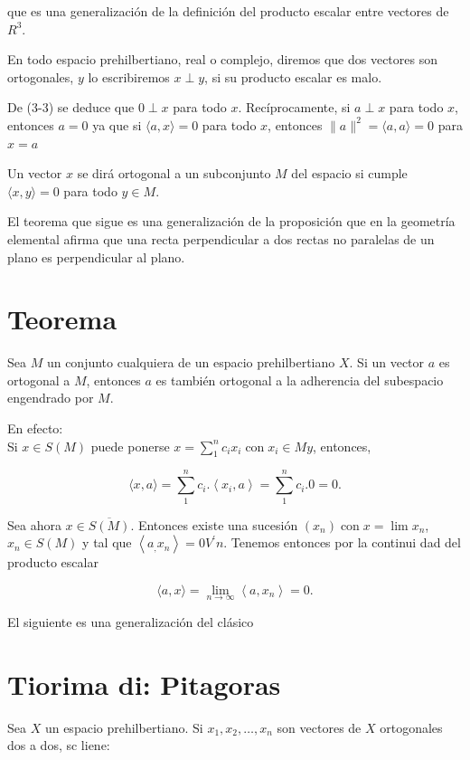 \documentclass[10pt]{article}
\theoremstyle{plain}
\theoremstyle{definition}
\theoremstyle{remark}
\begin{document}
que es una generalización de la definición del producto escalar entre vectores de $R^{3}$.


En todo espacio prehilbertiano, real o complejo, diremos que dos vectores son ortogonales, $y$ lo escribiremos $x \perp y$, si su producto escalar es malo.

De (3-3) se deduce que $0 \perp x$ para todo $x$. Recíprocamente, si $a \perp x$ para todo $x$, entonces $a=0$ ya que si $\langle a, x\rangle=0$ para todo $x$, entonces $\|a\|^{2}=\langle a, a\rangle=0$ para $x=a$

Un vector $x$ se dirá ortogonal a un subconjunto $M$ del espacio si cumple $\langle x, y\rangle=0$ para todo $y \in M$.

El teorema que sigue es una generalización de la proposición que en la geometría elemental afirma que una recta perpendicular a dos rectas no paralelas de un plano es perpendicular al plano.

\section*{Teorema}
Sea $M$ un conjunto cualquiera de un espacio prehilbertiano $X$. Si un vector $a$ es ortogonal a $M$, entonces $a$ es también ortogonal a la adherencia del subespacio engendrado por $M$.

En efecto:\\
Si $x \in S(M)$ puede ponerse $x=\sum_{1}^{n} c_{i} x_{i} \operatorname{con} x_{i} \in M y$, entonces,

$$
\langle x, a\rangle=\sum_{1}^{n} c_{i} .\left\langle x_{i}, a\right\rangle=\sum_{1}^{n} c_{i} .0=0 .
$$

Sea ahora $x \in \overline{S(M)}$. Entonces existe una sucesión $\left(x_{n}\right) \operatorname{con} x=\lim x_{n}$, $x_{n} \in S(M)$ y tal que $\left\langle a_{,} x_{n}\right\rangle=0 V^{\prime} n$. Tenemos entonces por la continui dad del producto escalar

$$
\langle a, x\rangle=\lim _{n \rightarrow \infty}\left\langle a, x_{n}\right\rangle=0 .
$$

El siguiente es una generalización del clásico

\section*{Tiorima di: Pitagoras}
Sea $X$ un espacio prehilbertiano. Si $x_{1}, x_{2}, \ldots, x_{n}$ son vectores de $X$ ortogonales dos a dos, sc liene:
\end{document}
